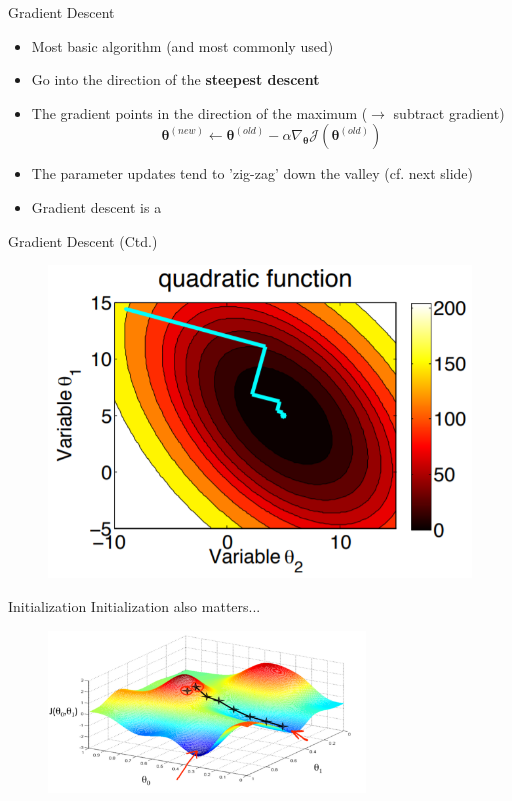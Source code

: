 \begin{frame}{Gradient Descent}{}
	\begin{itemize}
		\item Most basic algorithm (and most commonly used)
		\item Go into the direction of the \textbf{steepest descent}
		\item The gradient points in the direction of the maximum ($\rightarrow$ subtract gradient)
		\begin{equation}
			\bm{\theta}^{(new)} \longleftarrow \bm{\theta}^{(old)} -
				\alpha \nabla_{\bm{\theta}} \mathcal{J}(\bm{\theta}^{(old)})
		\end{equation}
		\item The parameter updates tend to 'zig-zag' down the valley (cf. next slide)
		\item Gradient descent is a 
	\end{itemize}
\end{frame}


\begin{frame}{Gradient Descent (Ctd.)}{}
	\begin{figure}
		\centering
		\includegraphics[scale=0.45]{02_math/02_img/gradient_descent}
	\end{figure}
\end{frame}


\begin{frame}{Initialization}{}
	Initialization also matters...
	\begin{figure}
		\centering
		\includegraphics[width=0.75\textwidth]{02_math/02_img/gradientascent}
	\end{figure}
\end{frame}


